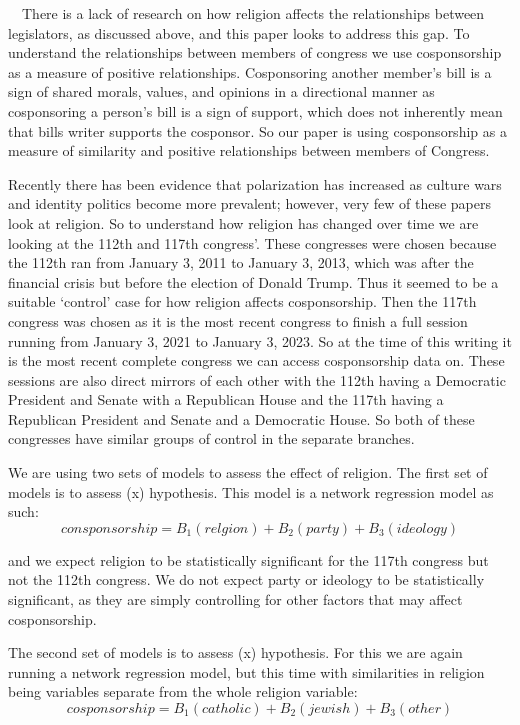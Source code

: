 \documentclass[Royal,times,sageh]{sagej}
\begin{document}
\doublespacing

~~There is a lack of research on how religion affects the relationships
between legislators, as discussed above, and this paper looks to address
this gap. To understand the relationships between members of congress we
use cosponsorship as a measure of positive relationships. Cosponsoring
another member's bill is a sign of shared morals, values, and opinions
in a directional manner as cosponsoring a person's bill is a sign of
support, which does not inherently mean that bills writer supports the
cosponsor. So our paper is using cosponsorship as a measure of
similarity and positive relationships between members of Congress.

Recently there has been evidence that polarization has increased as
culture wars and identity politics become more prevalent; however, very
few of these papers look at religion. So to understand how religion has
changed over time we are looking at the 112th and 117th congress'. These
congresses were chosen because the 112th ran from January 3, 2011 to
January 3, 2013, which was after the financial crisis but before the
election of Donald Trump. Thus it seemed to be a suitable `control' case
for how religion affects cosponsorship. Then the 117th congress was
chosen as it is the most recent congress to finish a full session
running from January 3, 2021 to January 3, 2023. So at the time of this
writing it is the most recent complete congress we can access
cosponsorship data on. These sessions are also direct mirrors of each
other with the 112th having a Democratic President and Senate with a
Republican House and the 117th having a Republican President and Senate
and a Democratic House. So both of these congresses have similar groups
of control in the separate branches.

We are using two sets of models to assess the effect of religion. The
first set of models is to assess (x) hypothesis. This model is a network
regression model as such: \[
consponsorship = B_1(relgion) + B_2(party) + B_3(ideology)
\]

and we expect religion to be statistically significant for the 117th
congress but not the 112th congress. We do not expect party or ideology
to be statistically significant, as they are simply controlling for
other factors that may affect cosponsorship.

The second set of models is to assess (x) hypothesis. For this we are
again running a network regression model, but this time with
similarities in religion being variables separate from the whole
religion variable: \[
cosponsorship = B_1(catholic) + B_2(jewish) + B_3(other) 
\]
\end{document}

